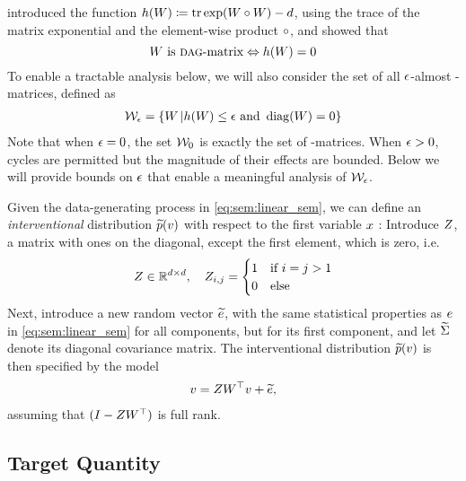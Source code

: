 \citet{zheng_dags_2018} introduced the function $h(W) \coloneqq \operatorname*{tr} \exp (W \circ W)-d$, using the trace of the matrix exponential and the element-wise product $\circ$, and showed that
\[ W \text{ is \textsc{dag}-matrix} \Leftrightarrow h(W) =0\]
To enable a tractable analysis below, we will also consider the set of all $\epsilon$-almost \DAG{}-matrices, defined as
\begin{align}
    \label{eq:def:semCoeffMatSet}
    \mathcal W_\epsilon = \left\{ W\, \middle| h(W) \leq \epsilon  \text{ and } \operatorname*{diag}(W)=0 \right\}
\end{align}
Note that when $\epsilon=0$, the set  $\mathcal W_0$ is exactly the set of \DAG-matrices.
When $\epsilon > 0$, cycles are permitted but the magnitude of their effects are bounded. Below we will provide bounds on $\epsilon$ that enable a meaningful analysis of $\mathcal W_\epsilon$.

Given the data-generating process in \eqref{eq:sem:linear_sem}, we can define an \emph{interventional} distribution $\widetilde{p}(v)$ with respect to the first variable $x$ \citep{pearl_causality:_2009}:
Introduce $Z$, a matrix with ones on the diagonal, except the first element, which is zero, i.e.
\begin{equation}\label{eq:def:mutilatingMatrix}
    Z \in \mathbb R^{d\times d},\quad Z_{i,j} = \begin{cases} 1& \text{if } i=j>1\\ 0 &\text{else}\end{cases}
\end{equation}
Next, introduce a new random vector $\widetilde {e} $, with the same statistical properties as $e$ in \eqref{eq:sem:linear_sem} for all components, but for its first component, and let $\widetilde {\Sigma}$ denote its diagonal covariance matrix.
The interventional distribution $\widetilde{p}(v)$ is then specified by the model
\begin{align}
    \label{eq:mutilated_dgp}
    v = Z W^\top v +  \widetilde {e} ,
\end{align}
assuming that $(I - Z W^\top )$ is full rank.



\subsection{Target Quantity}

